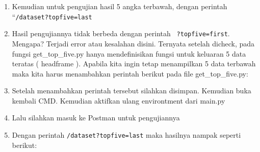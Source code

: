 \begin{enumerate}
\item Kemudian untuk pengujian hasil 5 angka terbawah, dengan perintah “\verb|/dataset?topfive=last|
\item Hasil pengujiannya tidak berbeda dengan perintah \verb| ?topfive=first|. Mengapa? Terjadi error atau kesalahan disini. Ternyata setelah dicheck, pada fungsi get\_top\_five.py hanya mendefinisikan fungsi untuk keluaran 5 data teratas ( headframe ). Apabila kita ingin tetap menampilkan 5 data terbawah maka kita harus menambahkan perintah berikut pada file get\_top\_five.py:
\item Setelah menambahkan perintah tersebut silahkan disimpan. Kemudian buka kembali CMD. Kemudian aktifkan ulang environtment dari main.py
\item Lalu silahkan masuk ke Postman untuk pengujiannya
\item Dengan perintah \verb|/dataset?topfive=last| maka hasilnya nampak seperti berikut:
\end{enumerate}

